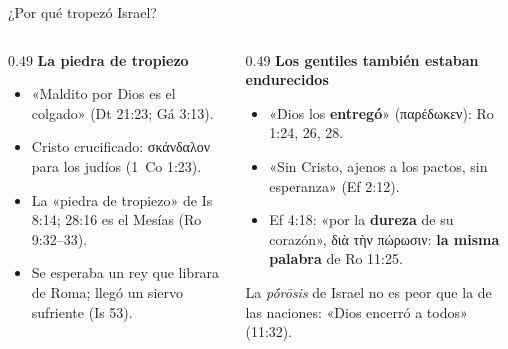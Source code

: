 \documentclass[hyperref={bookmarks=false},aspectratio=169]{beamer}
\newcommand{\grc}[1]{\foreignlanguage{ancientgreek}{#1}}
\begin{document}
\begin{frame}{¿Por qué tropezó Israel?}
\begin{columns}[T,onlytextwidth]
\begin{column}{0.49\textwidth}\scriptsize\RaggedRight
\textbf{\textcolor{cafe}{La piedra de tropiezo}}
\begin{itemize}
\item «Maldito por Dios es el colgado» (Dt 21:23; Gá 3:13).
\item Cristo crucificado: \grc{σκάνδαλον} para los judíos (1~Co 1:23).
\item La «piedra de tropiezo» de Is 8:14; 28:16 es el Mesías (Ro 9:32--33).
\item Se esperaba un rey que librara de Roma; llegó un siervo sufriente (Is 53).
\end{itemize}
\end{column}
\begin{column}{0.49\textwidth}\scriptsize\RaggedRight
\textbf{\textcolor{cafe}{Los gentiles también estaban endurecidos}}
\begin{itemize}
\item «Dios los \textbf{entregó}» (\grc{παρέδωκεν}): Ro 1:24, 26, 28.
\item «Sin Cristo, ajenos a los pactos, sin esperanza» (Ef 2:12).
\item Ef 4:18: «por la \textbf{dureza} de su corazón», \grc{διὰ τὴν πώρωσιν}: \textbf{la misma palabra} de Ro 11:25.
\end{itemize}
\begin{tcolorbox}[colback=piedra,colframe=ladrillo,boxrule=0.8pt,arc=2pt,fontupper=\scriptsize]
La \emph{pṓrōsis} de Israel no es peor que la de las naciones: «Dios encerró a todos» (11:32).
\end{tcolorbox}
\end{column}
\end{columns}
\end{frame}
\end{document}
